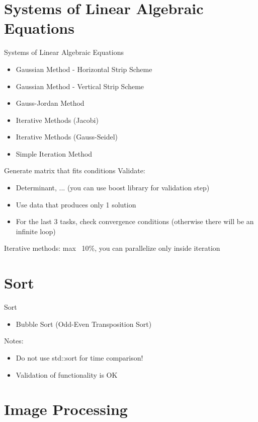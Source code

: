 \documentclass{beamer}
\begin{document}
\section{Systems of Linear Algebraic Equations}

\begin{frame}{Systems of Linear Algebraic Equations}
  \begin{itemize}
    \item Gaussian Method - Horizontal Strip Scheme
    \item Gaussian Method - Vertical Strip Scheme
    \item Gauss-Jordan Method
    \item Iterative Methods (Jacobi)
    \item Iterative Methods (Gauss-Seidel)
    \item Simple Iteration Method
  \end{itemize}
  Generate matrix that fits conditions
  Validate:
  \begin{itemize}
    \item Determinant, ... (you can use boost library for validation step)
    \item Use data that produces only 1 solution
    \item For the last 3 tasks, check convergence conditions (otherwise there will be an infinite loop)
  \end{itemize}
  Iterative methods: max ~10\%, you can parallelize only inside iteration
\end{frame}

\section{Sort}

\begin{frame}{Sort}
  \begin{itemize}
    \item Bubble Sort (Odd-Even Transposition Sort)
  \end{itemize}
  Notes:
  \begin{itemize}
    \item Do not use std::sort for time comparison!
    \item Validation of functionality is OK
  \end{itemize}
\end{frame}

\section{Image Processing}
\end{document}
